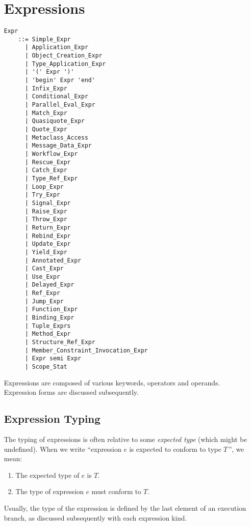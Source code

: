
\chapter{Expressions}

\minitoc

\newpage

\grammar\begin{lstlisting}
Expr        
    ::= Simple_Expr
      | Application_Expr
      | Object_Creation_Expr
      | Type_Application_Expr
      | '(' Expr ')'
      | 'begin' Expr 'end'
      | Infix_Expr
      | Conditional_Expr
      | Parallel_Eval_Expr
      | Match_Expr
      | Quasiquote_Expr
      | Quote_Expr
      | Metaclass_Access
      | Message_Data_Expr
      | Workflow_Expr
      | Rescue_Expr
      | Catch_Expr
      | Type_Ref_Expr
      | Loop_Expr
      | Try_Expr
      | Signal_Expr
      | Raise_Expr
      | Throw_Expr
      | Return_Expr
      | Rebind_Expr
      | Update_Expr
      | Yield_Expr
      | Annotated_Expr
      | Cast_Expr
      | Use_Expr
      | Delayed_Expr
      | Ref_Expr
      | Jump_Expr
      | Function_Expr
      | Binding_Expr
      | Tuple_Exprs
      | Method_Expr
      | Structure_Ref_Expr
      | Member_Constraint_Invocation_Expr
      | Expr semi Expr
      | Scope_Stat
\end{lstlisting}

Expressions are composed of various keywords, operators and operands. Expression forms are discussed subsequently. 







\section{Expression Typing}
\label{sec:expression-typing}

The typing of expressions is often relative to some {\em expected type} (which might be undefined). When we write ``expression $e$ is expected to conform to type $T$\,'', we mean:
\begin{enumerate}
  \item The expected type of $e$ is $T$.
  \item The type of expression $e$ must conform to $T$. 
\end{enumerate}

Usually, the type of the expression is defined by the last element of an execution branch, as discussed subsequently with each expression kind. 

